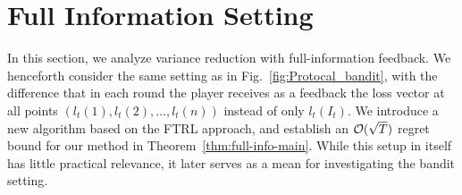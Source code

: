 
\section{Full Information Setting} \label{sec:full-info}
In this section, we analyze variance reduction with full-information feedback.
We henceforth consider the same setting as in Fig.~\ref{fig:Protocal_bandit}, with the difference that in each round the player receives as a feedback the loss vector at all points $(l_t(1), l_t(2), \dots, l_t(n))$ instead of only $l_t(I_t)$. 
We introduce a new algorithm based on the FTRL approach, and establish an $\mathcal{O}(\sqrt{T})$ regret bound for our method 
in Theorem~\ref{thm:full-info-main}. 
While this setup in itself has little practical relevance, it  
  later  serves as a mean for investigating the bandit setting. 
  
  

